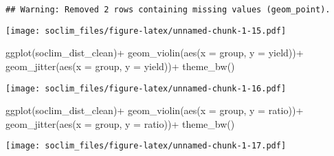 \documentclass[
]{article}
\newenvironment{Shaded}{\begin{snugshade}}{\end{snugshade}}
\newcommand{\AttributeTok}[1]{\textcolor[rgb]{0.77,0.63,0.00}{#1}}
\newcommand{\FunctionTok}[1]{\textcolor[rgb]{0.00,0.00,0.00}{#1}}
\newcommand{\NormalTok}[1]{#1}
\newcommand{\SpecialCharTok}[1]{\textcolor[rgb]{0.00,0.00,0.00}{#1}}
\begin{document}
\begin{verbatim}
## Warning: Removed 2 rows containing missing values (geom_point).
\end{verbatim}

\texttt{[image: soclim\_files/figure-latex/unnamed-chunk-1-15.pdf]}

\begin{Shaded}
\begin{Highlighting}[]
\FunctionTok{ggplot}\NormalTok{(soclim\_dist\_clean)}\SpecialCharTok{+}
  \FunctionTok{geom\_violin}\NormalTok{(}\FunctionTok{aes}\NormalTok{(}\AttributeTok{x =}\NormalTok{ group, }\AttributeTok{y =}\NormalTok{ yield))}\SpecialCharTok{+}
  \FunctionTok{geom\_jitter}\NormalTok{(}\FunctionTok{aes}\NormalTok{(}\AttributeTok{x =}\NormalTok{ group, }\AttributeTok{y =}\NormalTok{ yield))}\SpecialCharTok{+}
  \FunctionTok{theme\_bw}\NormalTok{()}
\end{Highlighting}
\end{Shaded}

\texttt{[image: soclim\_files/figure-latex/unnamed-chunk-1-16.pdf]}

\begin{Shaded}
\begin{Highlighting}[]
\FunctionTok{ggplot}\NormalTok{(soclim\_dist\_clean)}\SpecialCharTok{+}
  \FunctionTok{geom\_violin}\NormalTok{(}\FunctionTok{aes}\NormalTok{(}\AttributeTok{x =}\NormalTok{ group, }\AttributeTok{y =}\NormalTok{ ratio))}\SpecialCharTok{+}
  \FunctionTok{geom\_jitter}\NormalTok{(}\FunctionTok{aes}\NormalTok{(}\AttributeTok{x =}\NormalTok{ group, }\AttributeTok{y =}\NormalTok{ ratio))}\SpecialCharTok{+}
  \FunctionTok{theme\_bw}\NormalTok{()}
\end{Highlighting}
\end{Shaded}

\texttt{[image: soclim\_files/figure-latex/unnamed-chunk-1-17.pdf]}
\end{document}
